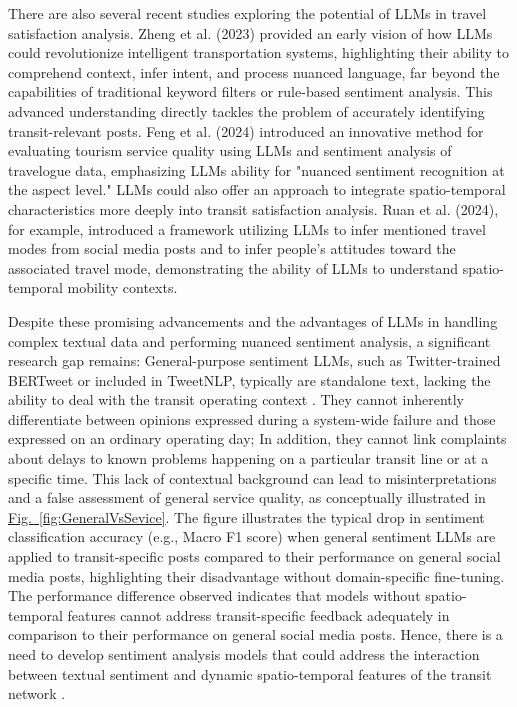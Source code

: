 \documentclass[a4paper,fleqn,12pt]{cas-sc}
\begin{document}
There are also several recent studies exploring the potential of LLMs in travel satisfaction analysis. Zheng et al. (2023) provided an early vision of how LLMs could revolutionize intelligent transportation systems, highlighting their ability to comprehend context, infer intent, and process nuanced language, far beyond the capabilities of traditional keyword filters or rule-based sentiment analysis. This advanced understanding directly tackles the problem of accurately identifying transit-relevant posts. Feng et al. (2024) introduced an innovative method for evaluating tourism service quality using LLMs and sentiment analysis of travelogue data, emphasizing LLMs ability for "nuanced sentiment recognition at the aspect level." LLMs could also offer an approach to integrate spatio-temporal characteristics more deeply into transit satisfaction analysis. Ruan et al. (2024), for example, introduced a framework utilizing LLMs to infer mentioned travel modes from social media posts and to infer people’s attitudes toward the associated travel mode, demonstrating the ability of LLMs to understand spatio-temporal mobility contexts.


Despite these promising advancements and the advantages of LLMs in handling complex textual data and performing nuanced sentiment analysis, a significant research gap remains: General-purpose sentiment LLMs, such as Twitter-trained BERTweet or included in TweetNLP, typically are standalone text, lacking the ability to deal with the transit operating context \citep{camacho2022tweetnlp}. They cannot inherently differentiate between opinions expressed during a system-wide failure and those expressed on an ordinary operating day; In addition, they cannot link complaints about delays to known problems happening on a particular transit line or at a specific time. This lack of contextual background can lead to misinterpretations and a false assessment of general service quality, as conceptually illustrated in \hyperref[fig:GeneralVsSevice]{Fig.~\ref{fig:GeneralVsSevice}}. The figure illustrates the typical drop in sentiment classification accuracy (e.g., Macro F1 score) when general sentiment LLMs are applied to transit-specific posts compared to their performance on general social media posts, highlighting their disadvantage without domain-specific fine-tuning. The performance difference observed indicates that models without spatio-temporal features cannot address transit-specific feedback adequately in comparison to their performance on general social media posts. Hence, there is a need to develop sentiment analysis models that could address the interaction between textual sentiment and dynamic spatio-temporal features of the transit network \citep{lei2020inferring, cheng2025arrival}.
\end{document}
